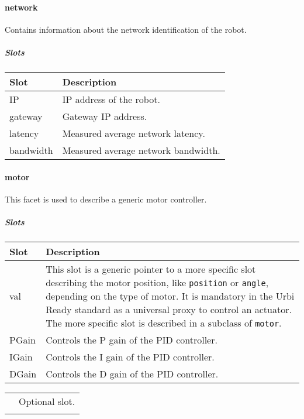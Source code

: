 \documentclass[a4paper]{article}
\begin{document}
\paragraph{network}


Contains information about the network identification of the robot.

\subparagraph{Slots}

\begin{flushleft}
\tablehead{}
\begin{supertabular}{|m{2.8669999cm}|m{12.422cm}|}
\hline
\sffamily\bfseries Slot &
\sffamily\bfseries Description\\\hline
IP &
\sffamily IP address of the robot.\\\hline
gateway &
\sffamily Gateway IP address.\\\hline
latency &
\sffamily Measured average network
latency.\\\hline
bandwidth &
\sffamily Measured average network
bandwidth.\\\hline
\end{supertabular}
\end{flushleft}
\paragraph{motor}


This facet is used to describe a generic motor controller.

\subparagraph{Slots}

\begin{flushleft}
\tablehead{}
\begin{supertabular}{|m{2.8669999cm}|m{12.422cm}|}
\hline
\sffamily\bfseries Slot &
\sffamily\bfseries Description\\\hline
val &
\sffamily This slot is a generic pointer to a
more specific slot describing the motor position, like
\texttt{position} or \texttt{angle}, depending on the type of motor. It
is mandatory in the Urbi Ready standard as a universal proxy to control
an actuator. The more specific slot is described in a subclass of
\texttt{motor}.\\\hline
PGain &
\sffamily Controls the P gain of the PID
controller.\\\hline
IGain &
\sffamily Controls the I gain of the PID
controller.\\\hline
DGain &
\sffamily Controls the D gain of the PID
controller.\\\hline
\end{supertabular}
\end{flushleft}
\begin{flushleft}
\tablehead{}
\begin{supertabular}{|m{1.717cm}|m{10.464cm}}
\hhline{-~}
 &
\sffamily Optional slot.\\\hhline{-~}
\end{supertabular}
\end{flushleft}
\end{document}
